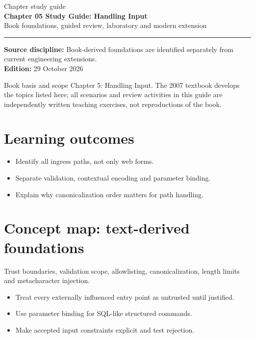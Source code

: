 \documentclass[10pt,letterpaper]{article}
\begin{document}
\hypersetup{pageanchor=false}%
\begin{titlepage}
\vspace*{1.0in}
{\color{bluegray}\Large Chapter study guide}\\[1.0em]
{\color{navy}\Huge\bfseries Chapter 05 Study Guide: Handling Input}\\[0.7em]
{\Large Book foundations, guided review, laboratory and modern extension}\\[2.0em]
\rule{\linewidth}{1.0pt}
\vfill
\textbf{Source discipline:} Book-derived foundations are identified separately from current engineering extensions.\\
\textbf{Edition:} 29 October 2026
\end{titlepage}\hypersetup{pageanchor=true}
\tableofcontents
\clearpage
\begin{focusbox}{Book basis and scope}
Chapter 5: Handling Input. The 2007 textbook develops the topics listed here; all scenarios and review activities in this guide are independently written teaching exercises, not reproductions of the book.\end{focusbox}
\section{Learning outcomes}
\begin{itemize}
\item Identify all ingress paths, not only web forms.
\item Separate validation, contextual encoding and parameter binding.
\item Explain why canonicalization order matters for path handling.
\end{itemize}

\section{Concept map: text-derived foundations}
Trust boundaries, validation scope, allowlisting, canonicalization, length limits and metacharacter injection.
\begin{itemize}
\item Treat every externally influenced entry point as untrusted until justified.
\item Use parameter binding for SQL-like structured commands.
\item Make accepted input constraints explicit and test rejection.
\end{itemize}
\end{document}
